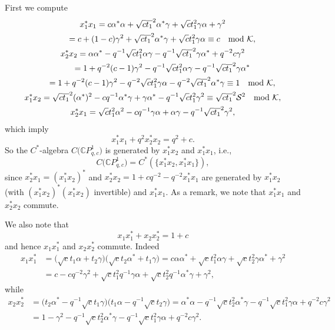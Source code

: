 \documentclass[11pt]{article}
\numberwithin{equation}{section}
\begin{document}
First we compute
\begin{gather*}
x_{1}^{\ast}x_{1} =c\alpha^{\ast}\alpha+\sqrt{c}\overline{t_{1}}^{2}%
\alpha^{\ast}\gamma+\sqrt{c}t_{1}^{2}\gamma\alpha+\gamma^{2}\\
\hphantom{x_{1}^{\ast}x_{1}}{} =c+(1-c) \gamma^{2}+\sqrt{c}\overline{t_{1}}^{2}\alpha^{\ast
}\gamma+\sqrt{c}t_{1}^{2}\gamma\alpha\equiv c\quad \text{mod\ }\mathcal{K},
\\
x_{2}^{\ast}x_{2} =\alpha\alpha^{\ast}-q^{-1}\sqrt{c}t_{1}^{2}\alpha
\gamma-q^{-1}\sqrt{c}\overline{t_{1}}^{2}\gamma\alpha^{\ast}+q^{-2}c\gamma
^{2}\\
\hphantom{x_{2}^{\ast}x_{2}}{} =1+q^{-2}(c-1) \gamma^{2}-q^{-1}\sqrt{c}t_{1}^{2}\alpha
\gamma-q^{-1}\sqrt{c}\overline{t_{1}}^{2}\gamma\alpha^{\ast}\\
\hphantom{x_{2}^{\ast}x_{2}}{} =1+q^{-2}(c-1) \gamma^{2}-q^{-2}\sqrt{c}t_{1}^{2}\gamma
\alpha-q^{-2}\sqrt{c}\overline{t_{1}}^{2}\alpha^{\ast}\gamma\equiv
1\quad \text{mod\ }\mathcal{K},
\\
x_{1}^{\ast}x_{2}=\sqrt{c}\overline{t_{1}}^{2} ( \alpha^{\ast} )
^{2}-cq^{-1}\alpha^{\ast}\gamma+\gamma\alpha^{\ast}-q^{-1}\sqrt{c}t_{1}%
^{2}\gamma^{2}\equiv\sqrt{c}\overline{t_{1}}^{2}\mathcal{S}^{2} \quad \text{mod\ }
\mathcal{K},
\\
x_{2}^{\ast}x_{1}=\sqrt{c}t_{1}^{2}\alpha^{2}-cq^{-1}\gamma\alpha+\alpha
\gamma-q^{-1}\sqrt{c}\overline{t_{1}}^{2}\gamma^{2},
\end{gather*}
which imply
\[
x_{1}^{\ast}x_{1}+q^{2}x_{2}^{\ast}x_{2}=q^{2}+c.
\]
So the $C^*$-algebra $C\big( \mathbb{C}P_{q,c}^{1}\big) $ is generated by
$x_{1}^{\ast}x_{2}$ and $x_{1}^{\ast}x_{1}$, i.e.,
\[
C \big( \mathbb{C}P_{q,c}^{1} \big) =C^{\ast} ( \{ x_{1}^{\ast
}x_{2}, x_{1}^{\ast}x_{1} \} ) ,
\]
since $x_{2}^{\ast}x_{1}= ( x_{1}^{\ast}x_{2} ) ^{\ast}$ and
$x_{2}^{\ast}x_{2}=1+cq^{-2}-q^{-2}x_{1}^{\ast}x_{1}$ are generated by
$x_{1}^{\ast}x_{2}$ (with $ ( x_{1}^{\ast}x_{2} ) ^{\ast} (
x_{1}^{\ast}x_{2} ) $ invertible) and $x_{1}^{\ast}x_{1}$. As a remark,
we note that $x_{1}^{\ast}x_{1}$ and $x_{2}^{\ast}x_{2}$ commute.

We also note that
\[
x_{1}x_{1}^{\ast}+x_{2}x_{2}^{\ast}=1+c
\]
and hence $x_{1}x_{1}^{\ast}$ and $x_{2}x_{2}^{\ast}$ commute. Indeed
\begin{align*}
x_{1}x_{1}^{\ast} & =\big( \sqrt{c}t_{1}\alpha+t_{2}\gamma\big) \big(
\sqrt{c}t_{2}\alpha^{\ast}+t_{1}\gamma\big) =c\alpha\alpha^{\ast}+\sqrt
{c}t_{1}^{2}\alpha\gamma+\sqrt{c}t_{2}^{2}\gamma\alpha^{\ast}+\gamma^{2}\\
& =c-cq^{-2}\gamma^{2}+\sqrt{c}t_{1}^{2}q^{-1}\gamma\alpha+\sqrt{c}t_{2}
^{2}q^{-1}\alpha^{\ast}\gamma+\gamma^{2},
\end{align*}
while
\begin{align*}
x_{2}x_{2}^{\ast} & =\big( t_{2}\alpha^{\ast}-q^{-1}\sqrt{c}t_{1}
\gamma\big) \big( t_{1}\alpha-q^{-1}\sqrt{c}t_{2}\gamma\big)
=\alpha^{\ast}\alpha-q^{-1}\sqrt{c}t_{2}^{2}\alpha^{\ast}\gamma-q^{-1}\sqrt
{c}t_{1}^{2}\gamma\alpha+q^{-2}c\gamma^{2}\\
& =1-\gamma^{2}-q^{-1}\sqrt{c}t_{2}^{2}\alpha^{\ast}\gamma-q^{-1}\sqrt
{c}t_{1}^{2}\gamma\alpha+q^{-2}c\gamma^{2}.
\end{align*}
\end{document}
